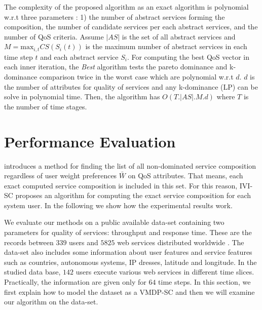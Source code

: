 \documentclass[10pt,journal,compsoc]{IEEEtran}
\begin{document}
The complexity of the proposed algorithm as an exact algorithm is polynomial w.r.t three parameters : 1) the number of abstract services forming the composition, the number of candidate services per each abstract services, and the number of QoS criteria. Assume $|AS|$ is the set of all abstract services and $M = \text{max}_{i,t} CS(S_i(t))$ is the maximum number of abstract services in each time step $t$ and each abstract service $S_i$. %
For computing the best QoS vector in each inner iteration, the \textit{Best} algorithm tests the pareto dominance and k-dominance comparison twice in the worst case which are polynomial w.r.t $d$. $d$ is the number of attributes for quality of services and any k-dominance (LP) can be solve in polynomial time. Then, the algorithm has $O(T.|AS|.M.d)$ where $T$ is the number of time stages. 

\section{Performance Evaluation}\label{sec:results}


\cite{mostafa2015multi} introduces a method for finding the list of all non-dominated service composition regardless of user weight preferences $\bar{W}$ on QoS attributes. That means, each exact computed service composition is included in this set. For this reason, IVI-SC proposes an algorithm for computing the exact service composition for each system user. In the following we show how the experimental results work. 

We evaluate our methods on a public available data-set containing two parameters for quality of services: throughput and response time. These are the records between $339$ users and $5825$ web services distributed worldwide \cite{Zheng2014,Zheng2015}. The data-set also includes some information about user features and service features such as countries, autonomous systems, IP dresses, latitude and longitude. In the studied data base, $142$ users execute various web services in different time slices. Practically, the information are given only for $64$ time steps. In this section, we first explain how to model the dataset as a VMDP-SC and then we will examine our algorithm on the data-set. 
\end{document}
